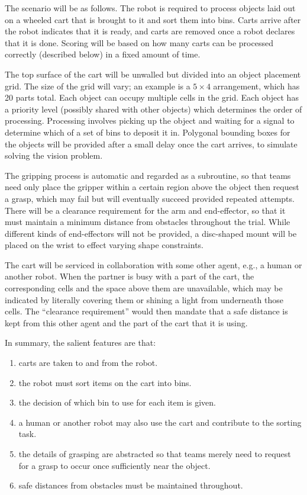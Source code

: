 \documentclass{amsart}
\theoremstyle{definition}
\begin{document}
The scenario will be as follows. The robot is required to process objects laid
out on a wheeled cart that is brought to it and sort them into bins. Carts arrive after
the robot indicates that it is ready, and carts are removed once a robot
declares that it is done. Scoring will be based on how many carts can be
processed correctly (described below) in a fixed amount of time.

The top surface of the cart will be unwalled but divided into an object
placement grid. The size of the grid will vary; an example is a $5 \times 4$
arrangement, which has 20 parts total. Each object can occupy multiple cells in the
grid. Each object has a priority level (possibly shared with other objects)
which determines the order of processing. Processing involves picking up the
object and waiting for a signal to determine which of a set of bins to deposit
it in. Polygonal bounding boxes for the objects will be provided after a small
delay once the cart arrives, to simulate solving the vision problem.

The gripping process is automatic and regarded as a subroutine, so that teams
need only place the gripper within a certain region above the object then
request a grasp, which may fail but will eventually succeed provided repeated
attempts.  There will be a clearance requirement for the arm and end-effector,
so that it must maintain a minimum distance from obstacles throughout the trial.
While different kinds of end-effectors will not be provided, a disc-shaped mount
will be placed on the wrist to effect varying shape constraints.

The cart will be serviced in collaboration with some other agent, e.g., a human
or another robot.  When the partner is busy with a part of the cart, the
corresponding cells and the space above them are unavailable, which may be
indicated by literally covering them or shining a light from underneath those
cells. The ``clearance requirement'' would then mandate that a safe distance is
kept from this other agent and the part of the cart that it is using.

In summary, the salient features are that:
\begin{enumerate}
\item carts are taken to and from the robot.
\item the robot must sort items on the cart into bins.
\item the decision of which bin to use for each item is given.
\item a human or another robot may also use the cart and contribute to the sorting task.
\item the details of grasping are abstracted so that teams merely need to request for a grasp to occur once sufficiently near the object.
\item safe distances from obstacles must be maintained throughout.
\end{enumerate}
\end{document}
